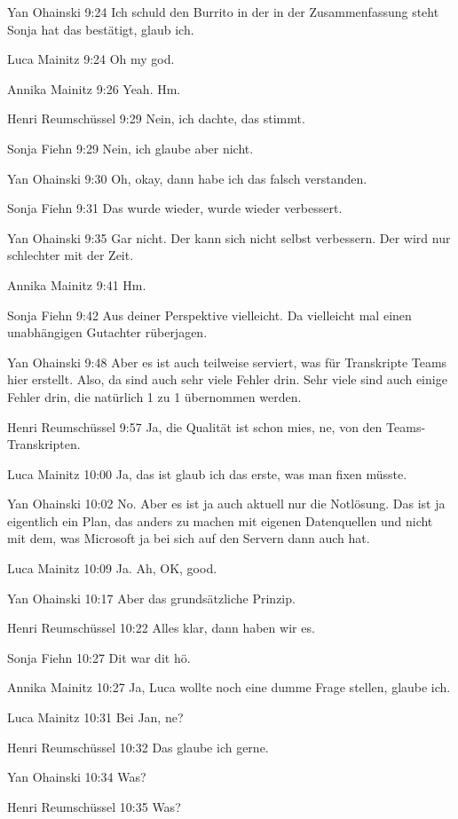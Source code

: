 Yan Ohainski   9:24
Ich schuld den Burrito in der in der Zusammenfassung steht Sonja hat das bestätigt, glaub ich.

Luca Mainitz   9:24
Oh my god.

Annika Mainitz   9:26
Yeah.
Hm.

Henri Reumschüssel   9:29
Nein, ich dachte, das stimmt.

Sonja Fiehn   9:29
Nein, ich glaube aber nicht.

Yan Ohainski   9:30
Oh, okay, dann habe ich das falsch verstanden.

Sonja Fiehn   9:31
Das wurde wieder, wurde wieder verbessert.

Yan Ohainski   9:35
Gar nicht. Der kann sich nicht selbst verbessern. Der wird nur schlechter mit der Zeit.

Annika Mainitz   9:41
Hm.

Sonja Fiehn   9:42
Aus deiner Perspektive vielleicht. Da vielleicht mal einen unabhängigen Gutachter rüberjagen.

Yan Ohainski   9:48
Aber es ist auch teilweise serviert, was für Transkripte Teams hier erstellt. Also, da sind auch sehr viele Fehler drin. Sehr viele sind auch einige Fehler drin, die natürlich 1 zu 1 übernommen werden.

Henri Reumschüssel   9:57
Ja, die Qualität ist schon mies, ne, von den Teams-Transkripten.

Luca Mainitz   10:00
Ja, das ist glaub ich das erste, was man fixen müsste.

Yan Ohainski   10:02
No.
Aber es ist ja auch aktuell nur die Notlösung. Das ist ja eigentlich ein Plan, das anders zu machen mit eigenen Datenquellen und nicht mit dem, was Microsoft ja bei sich auf den Servern dann auch hat.

Luca Mainitz   10:09
Ja.
Ah, OK, good.

Yan Ohainski   10:17
Aber das grundsätzliche Prinzip.

Henri Reumschüssel   10:22
Alles klar, dann haben wir es.

Sonja Fiehn   10:27
Dit war dit hö.

Annika Mainitz   10:27
Ja, Luca wollte noch eine dumme Frage stellen, glaube ich.

Luca Mainitz   10:31
Bei Jan, ne?

Henri Reumschüssel   10:32
Das glaube ich gerne.

Yan Ohainski   10:34
Was?

Henri Reumschüssel   10:35
Was?

